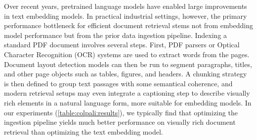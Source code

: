 
\noindent Over recent years, pretrained language models have enabled large improvements in text embedding models. In practical industrial settings, however, the primary performance bottleneck for efficient document retrieval stems not from embedding model performance but from the prior data ingestion pipeline. Indexing a standard PDF document involves several steps. First, PDF parsers or Optical Character Recognition (OCR) systems are used to extract words from the pages. Document layout detection models can then be run to segment paragraphs, titles, and other page objects such as tables, figures, and headers. A chunking strategy is then defined to group text passages with some semantical coherence, and modern retrieval setups may even integrate a captioning step to describe visually rich elements in a natural language form, more suitable for embedding models. 
In our experiments (\autoref{table:colpali:results}), we typically find that optimizing the ingestion pipeline yields much better performance on visually rich document retrieval than optimizing the text embedding model.



